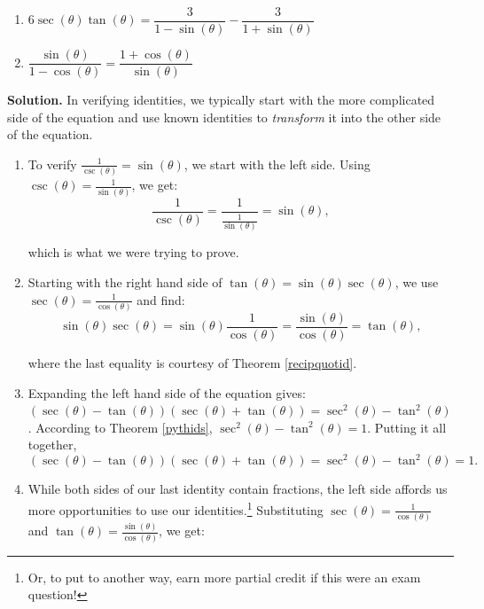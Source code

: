 \begin{ex}
\begin{multicols}{2}
\begin{enumerate}
\item  $6\sec(\theta) \tan(\theta) = \dfrac{3}{1-\sin(\theta)} - \dfrac{3}{1 + \sin(\theta)}$

\item  \label{pythconjex} $\dfrac{\sin(\theta)}{1 - \cos(\theta)} = \dfrac{1 + \cos(\theta)}{\sin(\theta)}$

\end{enumerate}

\end{multicols}

{\bf Solution.}  In verifying identities, we typically start with the more complicated side of the equation and use known identities to \textit{transform} it into the other side of the equation. 

\begin{enumerate} 

\item  To verify $\frac{1}{\csc(\theta)} = \sin(\theta)$, we start with the left side.  Using $\csc(\theta) = \frac{1}{\sin(\theta)}$, we get:  \[ \dfrac{1}{\csc(\theta)} = \dfrac{1}{\frac{1}{\sin(\theta)}} = \sin(\theta),\]

\enlargethispage{.1in} which is what we were trying to prove.

\item Starting with the right hand side of $\tan(\theta) = \sin(\theta) \sec(\theta)$, we use $\sec(\theta) = \frac{1}{\cos(\theta)}$ and find:  \[ \sin(\theta) \sec(\theta) = \sin(\theta) \dfrac{1}{\cos(\theta)} = \dfrac{\sin(\theta)}{\cos(\theta)} = \tan(\theta),\]

where the last equality is courtesy of Theorem \ref{recipquotid}.

\item Expanding the left hand side of the equation gives:  $(\sec(\theta) - \tan(\theta)) (\sec(\theta) + \tan(\theta)) = \sec^{2}(\theta) - \tan^{2}(\theta)$.  According to Theorem \ref{pythids}, $\sec^{2}(\theta) - \tan^{2}(\theta) = 1$.  Putting it all together, \[(\sec(\theta) - \tan(\theta)) (\sec(\theta) + \tan(\theta)) = \sec^{2}(\theta) - \tan^{2}(\theta)  = 1.\]


\item  While both sides of our last identity contain fractions, the left side affords us more opportunities to use our identities.\footnote{Or, to put to another way, earn more partial credit if this were an exam question!} Substituting $\sec(\theta) = \frac{1}{\cos(\theta)}$ and $\tan(\theta) = \frac{\sin(\theta)}{\cos(\theta)}$, we get:



\end{enumerate}
\end{ex}
